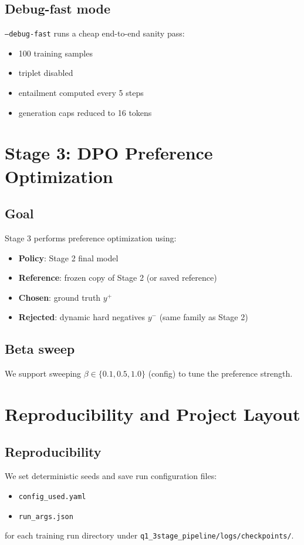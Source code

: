 \documentclass[11pt]{article}
\begin{document}
\subsection{Debug-fast mode}
\texttt{--debug-fast} runs a cheap end-to-end sanity pass:
\begin{itemize}
  \item 100 training samples
  \item triplet disabled
  \item entailment computed every 5 steps
  \item generation caps reduced to 16 tokens
\end{itemize}

\section{Stage 3: DPO Preference Optimization}
\subsection{Goal}
Stage 3 performs preference optimization using:
\begin{itemize}
  \item \textbf{Policy}: Stage 2 final model
  \item \textbf{Reference}: frozen copy of Stage 2 (or saved reference)
  \item \textbf{Chosen}: ground truth $y^+$
  \item \textbf{Rejected}: dynamic hard negatives $y^-$ (same family as Stage 2)
\end{itemize}

\subsection{Beta sweep}
We support sweeping $\beta \in \{0.1, 0.5, 1.0\}$ (config) to tune the preference strength.

\section{Reproducibility and Project Layout}
\subsection{Reproducibility}
We set deterministic seeds and save run configuration files:
\begin{itemize}
  \item \texttt{config\_used.yaml}
  \item \texttt{run\_args.json}
\end{itemize}
for each training run directory under \texttt{q1\_3stage\_pipeline/logs/checkpoints/}.
\end{document}
